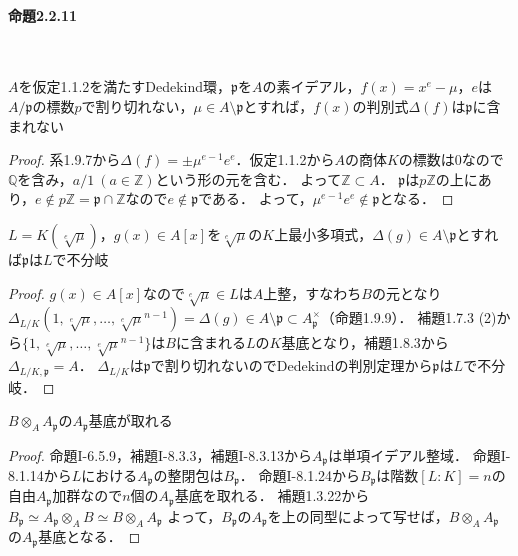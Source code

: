 \paragraph{命題2.2.11}~
\begin{screen}
  $A$を仮定1.1.2を満たすDedekind環，$\mathfrak{p}$を$A$の素イデアル，$f(x)=x^e-\mu$，$e$は$A/\mathfrak{p}$の標数$p$で割り切れない，$\mu\in A\setminus\mathfrak{p}$とすれば，$f(x)$の判別式$\varDelta(f)$は$\mathfrak{p}$に含まれない
\end{screen}
\begin{proof}
  系1.9.7から$\varDelta(f)=\pm\mu^{e-1}e^e$．仮定1.1.2から$A$の商体$K$の標数は$0$なので$\mathbb{Q}$を含み，$a/1\ (a\in\mathbb{Z})$という形の元を含む．
  よって$\mathbb{Z}\subset A$．
  $\mathfrak{p}$は$p\mathbb{Z}$の上にあり，$e \not\in p\mathbb{Z} = \mathfrak{p} \cap \mathbb{Z}$なので$e\not\in\mathfrak{p}$である．
  よって，$\mu^{e-1}e^e\not\in\mathfrak{p}$となる．
\end{proof}

\begin{screen}
  $L=K(\sqrt[e]{\mu})$，$g(x)\in A[x]$を$\sqrt[e]{\mu}$の$K$上最小多項式，$\varDelta(g)\in A\setminus\mathfrak{p}$とすれば$\mathfrak{p}$は$L$で不分岐
\end{screen}
\begin{proof}
  $g(x)\in A[x]$なので$\sqrt[e]{\mu}\in L$は$A$上整，すなわち$B$の元となり$\varDelta_{L/K}(1, \sqrt[e]{\mu}, \ldots, \sqrt[e]{\mu}^{n-1})=\varDelta(g)\in A\setminus\mathfrak{p}\subset A_\mathfrak{p}^\times$（命題1.9.9）．
  補題1.7.3 (2)から$\{ 1, \sqrt[e]{\mu}, \ldots, \sqrt[e]{\mu}^{n-1} \}$は$B$に含まれる$L$の$K$基底となり，補題1.8.3から$\varDelta_{L/K, \mathfrak{p}}=A$．
  $\varDelta_{L/K}$は$\mathfrak{p}$で割り切れないのでDedekindの判別定理から$\mathfrak{p}$は$L$で不分岐．
\end{proof}

\begin{screen}
  $B\otimes_AA_\mathfrak{p}$の$A_\mathfrak{p}$基底が取れる
\end{screen}
\begin{proof}
  命題I-6.5.9，補題I-8.3.3，補題I-8.3.13から$A_\mathfrak{p}$は単項イデアル整域．
  命題I-8.1.14から$L$における$A_\mathfrak{p}$の整閉包は$B_\mathfrak{p}$．
  命題I-8.1.24から$B_\mathfrak{p}$は階数$[L:K]=n$の自由$A_\mathfrak{p}$加群なので$n$個の$A_\mathfrak{p}$基底を取れる．
  補題1.3.22から$B_\mathfrak{p}\simeq A_\mathfrak{p}\otimes_AB\simeq B\otimes_AA_\mathfrak{p}$
  よって，$B_\mathfrak{p}$の$A_\mathfrak{p}$を上の同型によって写せば，$B\otimes_AA_\mathfrak{p}$の$A_\mathfrak{p}$基底となる．
\end{proof}

